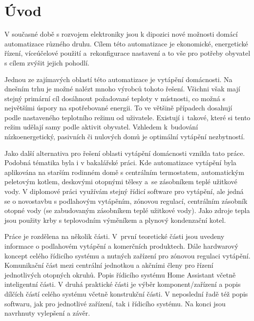 \chapter{Úvod}

V současné době s rozvojem elektroniky jsou k dipozici nové možnosti domácí automatizace různého druhu. Cílem této automatizace je ekonomické, energetické řízení, víceúčelové použití a~rekonfigurace nastavení a to vše pro potřeby obyvatel s cílem zvýšit jejich pohodlí.


Jednou ze zajímavých oblastí této automatizace je vytápění domácnosti. Na dnešním trhu je možné nalézt mnoho výrobců tohoto řešení. Všichni však mají stejný primární cíl dosáhnout požadované teploty v místnosti, co možná s největšími úspory na spotřebované energii. To ve většině případech dosahují podle nastaveného teplotního režimu od uživatele. Existují i~takové, které si tento režim udělají samy podle aktivit obyvatel. Vzhledem k~budování nízkoenergetický, pasivních či nulových domů je optimální vytápění nezbytností.

Jako další alternativa pro řešení oblasti vytápění domácnosti vznikla tato práce. Podobná tématika byla i v bakalářské práci. Kde automatizace vytápění byla aplikována na starším rodinném domě s centrálním termostatem, automatickým peletovým kotlem, deskovými otopnými tělesy a~se zásobníkem teplé užitkové vody. V diplomové práci využívám stejný řídicí software pro vytápění, ale jedná se o novostavbu s podlahovým vytápěním, zónovou regulací, centrálním zásobník otopné vody (se zabudovaným zásobníkem teplé užitkové vody). Jako zdroje tepla jsou použity krby s teplovodním výměníkem a plynový kondenzační kotel.

Práce je rozdělena na několik části. V~první teoretické části jsou uvedeny informace o podlahovém vytápění a komerčních produktech. Dále hardwarový koncept celého řídicího systému a nutných zařízení pro zónovou regulaci vytápění. Komunikační část mezi centrální jednotkou a akčními členy pro řízení jednotlivých otopných okruhů. Popis řídicího systému Home Assistant včetně inteligentní části. V druhá praktické části je výběr komponent/zařízení a popis dílčích částí celého systému včetně konstrukční části. V neposlední řadě též popis softwaru, jak pro jednotlivé zařízení, tak i řídicího systému. Na konci jsou navrhnuty vylepšení a závěr.

\newpage
